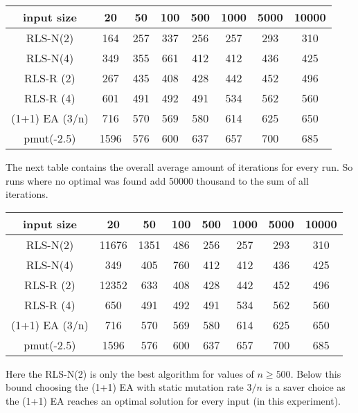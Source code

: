 \begin{tabular}{cccccccc}
      input size    & 20   & 50  & 100 & 500 & 1000 & 5000 & 10000 \\\hline
      RLS-N(2)      & 164  & 257 & 337 & 256 & 257  & 293  & 310   \\
      RLS-N(4)      & 349  & 355 & 661 & 412 & 412  & 436  & 425   \\
      RLS-R (2)      & 267  & 435 & 408 & 428 & 442  & 452  & 496   \\
      RLS-R (4)      & 601  & 491 & 492 & 491 & 534  & 562  & 560   \\
      (1+1) EA (3/n) & 716  & 570 & 569 & 580 & 614  & 625  & 650   \\
      pmut(-2.5)    & 1596 & 576 & 600 & 637 & 657  & 700  & 685   \\
\end{tabular}

The next table contains the overall average amount of iterations for every run.
So runs where no optimal was found add 50000 thousand to the sum of all iterations.

\begin{tabular}{cccccccc}
      input size    & 20    & 50   & 100 & 500 & 1000 & 5000 & 10000 \\\hline
      RLS-N(2)      & 11676 & 1351 & 486 & 256 & 257  & 293  & 310   \\
      RLS-N(4)      & 349   & 405  & 760 & 412 & 412  & 436  & 425   \\
      RLS-R (2)      & 12352 & 633  & 408 & 428 & 442  & 452  & 496   \\
      RLS-R (4)      & 650   & 491  & 492 & 491 & 534  & 562  & 560   \\
      (1+1) EA (3/n) & 716   & 570  & 569 & 580 & 614  & 625  & 650   \\
      pmut(-2.5)    & 1596  & 576  & 600 & 637 & 657  & 700  & 685   \\
\end{tabular}

Here the RLS-N(2) is only the best algorithm for values of $n \ge 500$.
Below this bound choosing the (1+1) EA with static mutation rate $3/n$ is a saver choice as the (1+1) EA reaches an optimal solution for every input (in this experiment).